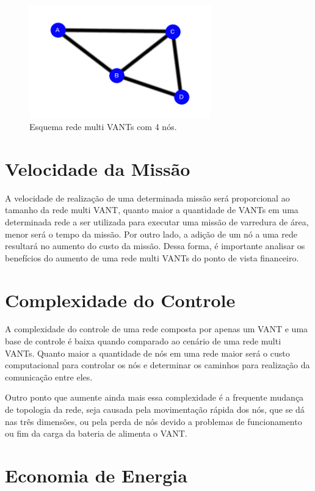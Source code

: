 \begin{figure} 
\center
\includegraphics[width=0.7\textwidth]{perdaNo.png}
\caption{Esquema rede multi VANTs com 4 nós.} 
\label{fig:perdaNo}
\end{figure} 

\section{Velocidade da Missão}

A velocidade de realização de uma determinada missão será proporcional ao tamanho da rede multi VANT, quanto maior a quantidade de VANTs em uma determinada rede a ser utilizada para executar uma missão de varredura de área, menor será o tempo da missão. Por outro lado, a adição de um nó a uma rede resultará no aumento do custo da missão. Dessa forma, é importante analisar os benefícios do aumento de uma rede multi VANTs do ponto de vista financeiro. 

\section{Complexidade do Controle}

A complexidade do controle de uma rede composta por apenas um VANT e uma base de controle é baixa quando comparado ao cenário de uma rede multi VANTs. Quanto maior a quantidade de nós em uma rede maior será o custo computacional para controlar os nós e determinar os caminhos para realização da comunicação entre eles.

Outro ponto que aumente ainda mais essa complexidade é a frequente mudança de topologia da rede, seja causada pela movimentação rápida dos nós, que se dá nas três dimensões, ou pela perda de nós devido a problemas de funcionamento ou fim da carga da bateria de alimenta o VANT.

\section{Economia de Energia}

